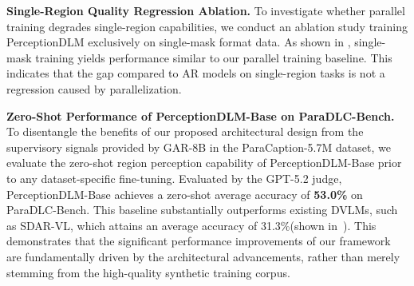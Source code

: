 \documentclass{llmxive}
\providecommand{\arraystretch}{1.3}
\begin{document}
\begin{table}[htbp]
\centering
\setlength{\tabcolsep}{6pt}
\renewcommand{\arraystretch}{1.15}
\caption{Caption length scaling on Parallel Captioning(Evaluated using Qwen3.5-27B Judge).}
\label{tab:length_scaling}
\end{table}

\noindent
\textbf{Single-Region Quality Regression Ablation.}
To investigate whether parallel training degrades single-region capabilities, we conduct an ablation study training PerceptionDLM exclusively on single-mask format data. As shown in , single-mask training yields performance similar to our parallel training baseline. This indicates that the gap compared to AR models on single-region tasks is not a regression caused by parallelization.

\begin{table}[htbp]
\centering
\setlength{\tabcolsep}{6pt}
\renewcommand{\arraystretch}{1.15}
\caption{Single Mask Training Ablation on DLC-Bench.}
\label{tab:single_mask_ablation}
\end{table}

\noindent
\textbf{Zero-Shot Performance of PerceptionDLM-Base on ParaDLC-Bench.}
To disentangle the benefits of our proposed architectural design from the supervisory signals provided by GAR-8B in the ParaCaption-5.7M dataset, we evaluate the zero-shot region perception capability of PerceptionDLM-Base prior to any dataset-specific fine-tuning. Evaluated by the GPT-5.2 judge, PerceptionDLM-Base achieves a zero-shot average accuracy of \textbf{53.0\%} on ParaDLC-Bench. This baseline substantially outperforms existing DVLMs, such as SDAR-VL, which attains an average accuracy of 31.3\%(shown in~). This demonstrates that the significant performance improvements of our framework are fundamentally driven by the architectural advancements, rather than merely stemming from the high-quality synthetic training corpus.
\end{document}
